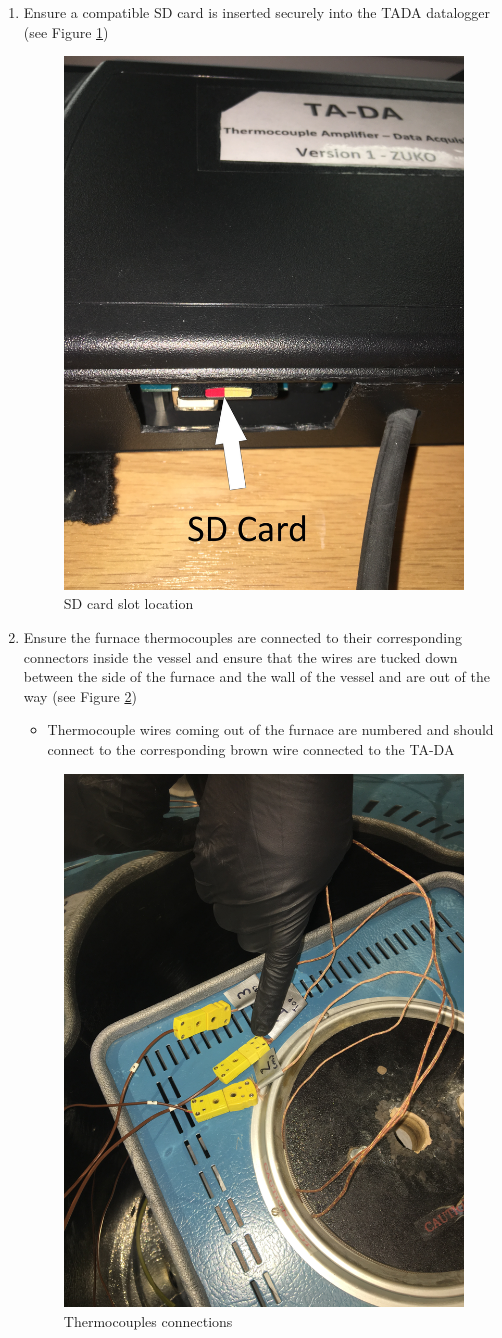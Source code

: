 \documentclass[letterpaper,11pt]{article}
\begin{document}
\begin{enumerate}
\begin{itemize}
        \end{itemize}
    
    \item Ensure a compatible SD card is inserted securely into the TADA 
        datalogger (see Figure \ref{fig:sd_card_reader})
        
\begin{figure}[H]
\centering
\includegraphics[width=.3\textwidth]{sd_card_reader.jpg}
\caption{SD card slot location}
\label{fig:sd_card_reader}
\end{figure}
        
    \item Ensure the furnace thermocouples are connected to their corresponding
		connectors inside the vessel and ensure that the wires are tucked down 
        between the side of the furnace and the wall of the vessel and are out 
        of the way (see Figure \ref{fig:Thermocouples})
		\begin {itemize}
		\item Thermocouple wires coming out of the furnace are numbered and
			should connect to the corresponding brown wire connected to 
			the TA-DA
		\end{itemize}
		
\begin{figure}[H]
\centering
\includegraphics[width=.4\textwidth]{Thermocouples.jpg}
\caption{Thermocouples connections}
\label{fig:Thermocouples}
\end{figure}		
		

\end{enumerate}
\end{document}
